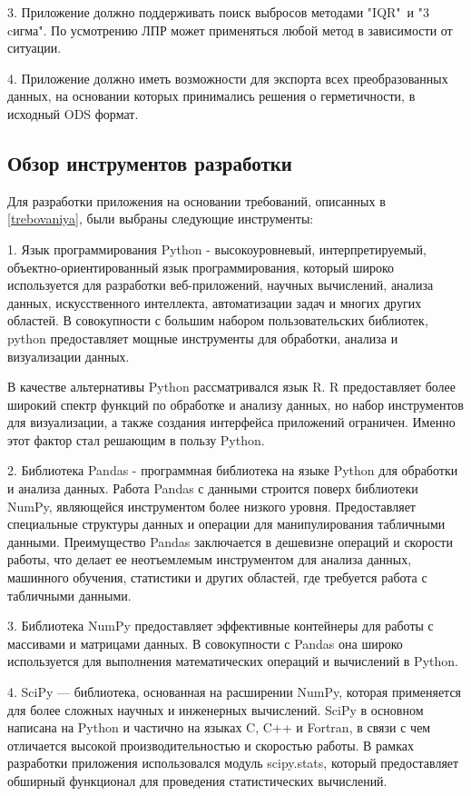 3. Приложение должно поддерживать поиск выбросов методами "IQR"\ и "3 cигма". По усмотрению ЛПР может применяться любой метод в зависимости от ситуации.

4. Приложение должно иметь возможности для экспорта всех преобразованных
данных, на основании которых принимались решения о герметичности, в
исходный ODS формат.

\subsection{Обзор инструментов разработки}

Для разработки приложения на основании требований, описанных в \ref{trebovaniya}, были выбраны следующие инструменты:

1. Язык программирования Python - высокоуровневый, интерпретируемый, объектно-ориентированный язык программирования, который широко используется для разработки веб-приложений, научных вычислений, анализа данных, искусственного интеллекта, автоматизации задач и многих других областей. В совокупности с большим набором пользовательских библиотек, python предоставляет мощные инструменты для обработки, анализа и визуализации данных. 

В качестве альтернативы Python рассматривался язык R. R предоставляет более широкий спектр функций по обработке и анализу данных, но набор инструментов для визуализации, а также создания интерфейса приложений ограничен. Именно этот фактор стал решающим в пользу Python.

2. Библиотека Pandas -  программная библиотека на языке Python для обработки и анализа данных. Работа Pandas с данными строится поверх библиотеки NumPy, являющейся инструментом более низкого уровня. Предоставляет специальные структуры данных и операции для манипулирования табличными данными. Преимущество Pandas заключается в дешевизне операций и скорости работы, что делает ее неотъемлемым инструментом для анализа данных, машинного обучения, статистики и других областей, где требуется работа с табличными данными.

3. Библиотека NumPy предоставляет эффективные контейнеры для
работы с массивами и матрицами данных. В совокупности с Pandas она широко используется для выполнения математических операций и вычислений в Python.

4. SciPy --- библиотека, основанная на расширении NumPy, которая применяется для более сложных научных и инженерных вычислений. SciPy в основном написана на Python и частично на языках C, C++ и Fortran, в связи с чем отличается высокой производительностью и скоростью работы. В рамках разработки приложения использовался модуль scipy.stats, который предоставляет обширный функционал для проведения статистических вычислений.

